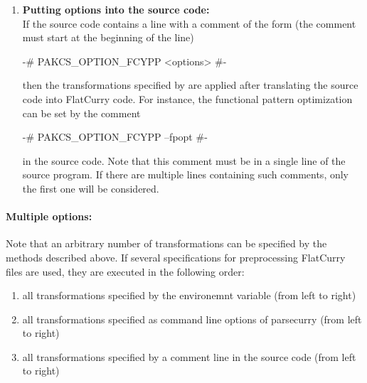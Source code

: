 \begin{enumerate}
\item {\bf Putting options into the source code:}\\
If the source code contains a line with a comment of the form (the comment
must start at the beginning of the line)
\begin{curry}
{-# PAKCS_OPTION_FCYPP <options> #-}
\end{curry}
then the transformations specified by  are applied after
translating the source code into FlatCurry code. For instance,
the functional pattern optimization can be set by the comment
\begin{curry}
{-# PAKCS_OPTION_FCYPP --fpopt #-}
\end{curry}
in the source code. Note that this comment must be in a single line 
of the source program. If there are multiple lines containing such comments,
only the first one will be considered.
\end{enumerate}
\paragraph{Multiple options:}
Note that an arbitrary number of transformations can be specified
by the methods described above.
If several specifications for preprocessing FlatCurry files are used,
they are executed in the following order:
\begin{enumerate}
\item all transformations specified by the environemnt variable
 (from left to right)
\item all transformations specified as command line options of parsecurry
   (from left to right)
\item all transformations specified by a comment line in the source code
   (from left to right)
\end{enumerate}



